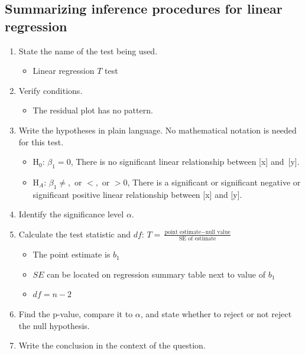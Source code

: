 \subsection{Summarizing inference procedures for linear regression}

\begin{termBox}{
\begin{enumerate}
\setlength{\itemsep}{0mm}
\item State the name of the test being used.\vspace{-1.5mm}
\begin{itemize}
\setlength{\itemsep}{0mm}
\item Linear regression $T$ test
\end{itemize}
\item Verify conditions.\vspace{-1.5mm}
\begin{itemize}
\setlength{\itemsep}{0mm}
\item The residual plot has no pattern.
\end{itemize}
\item Write the hypotheses in plain language.  No mathematical notation is needed for this test.\vspace{-1.5mm}
\begin{itemize}
\setlength{\itemsep}{0mm}
\item H$_0$: $\beta_1=0$, There is no significant linear relationship between [x] and~[y]. 
\item H$_A$: $\beta_1 \ne,\text{ or }<, \text{ or }>0$, There is a significant or significant negative or significant positive linear relationship between [x] and [y].  
\end{itemize}
\item Identify the significance level $\alpha$.
\item Calculate the test statistic and $df$: $T = \frac{\text{point estimate} - \text{null value}}{\text{SE of estimate}}$\vspace{-1.5mm}
\begin{itemize}
\setlength{\itemsep}{0mm}
\item The point estimate is $b_1$
\item $SE$ can be located on regression summary table next to value of $b_1$
\item $df = n-2$
\end{itemize}
\item Find the p-value, compare it to $\alpha$, and state whether to reject or not reject the null hypothesis.
\item Write the conclusion in the context of the question.
\end{enumerate}}
\end{termBox}

